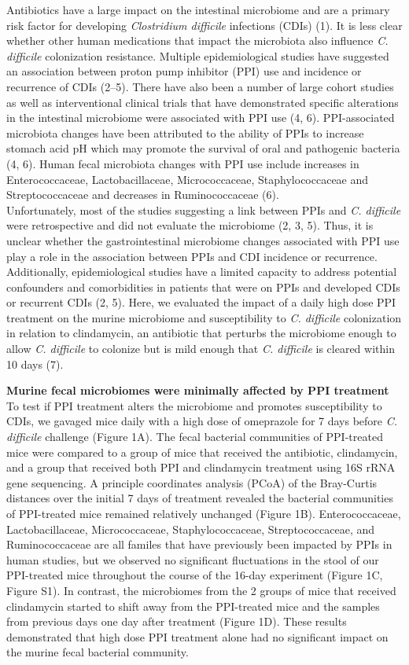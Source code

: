 \documentclass[11pt,]{article}
\begin{document}
Antibiotics have a large impact on the intestinal microbiome and are a
primary risk factor for developing \emph{Clostridium difficile}
infections (CDIs) (1). It is less clear whether other human medications
that impact the microbiota also influence \emph{C. difficile}
colonization resistance. Multiple epidemiological studies have suggested
an association between proton pump inhibitor (PPI) use and incidence or
recurrence of CDIs (2--5). There have also been a number of large cohort
studies as well as interventional clinical trials that have demonstrated
specific alterations in the intestinal microbiome were associated with
PPI use (4, 6). PPI-associated microbiota changes have been attributed
to the ability of PPIs to increase stomach acid pH which may promote the
survival of oral and pathogenic bacteria (4, 6). Human fecal microbiota
changes with PPI use include increases in Enterococcaceae,
Lactobacillaceae, Micrococcaceae, Staphylococcaceae and Streptococcaceae
and decreases in Ruminococcaceae (6).\\
Unfortunately, most of the studies suggesting a link between PPIs and
\emph{C. difficile} were retrospective and did not evaluate the
microbiome (2, 3, 5). Thus, it is unclear whether the gastrointestinal
microbiome changes associated with PPI use play a role in the
association between PPIs and CDI incidence or recurrence. Additionally,
epidemiological studies have a limited capacity to address potential
confounders and comorbidities in patients that were on PPIs and
developed CDIs or recurrent CDIs (2, 5). Here, we evaluated the impact
of a daily high dose PPI treatment on the murine microbiome and
susceptibility to \emph{C. difficile} colonization in relation to
clindamycin, an antibiotic that perturbs the microbiome enough to allow
\emph{C. difficile} to colonize but is mild enough that \emph{C.
difficile} is cleared within 10 days (7).

\textbf{Murine fecal microbiomes were minimally affected by PPI
treatment } To test if PPI treatment alters the microbiome and promotes
susceptibility to CDIs, we gavaged mice daily with a high dose of
omeprazole for 7 days before \emph{C. difficile} challenge (Figure 1A).
The fecal bacterial communities of PPI-treated mice were compared to a
group of mice that received the antibiotic, clindamycin, and a group
that received both PPI and clindamycin treatment using 16S rRNA gene
sequencing. A principle coordinates analysis (PCoA) of the Bray-Curtis
distances over the initial 7 days of treatment revealed the bacterial
communities of PPI-treated mice remained relatively unchanged (Figure
1B). Enterococcaceae, Lactobacillaceae, Micrococcaceae,
Staphylococcaceae, Streptococcaceae, and Ruminococcaceae are all familes
that have previously been impacted by PPIs in human studies, but we
observed no significant fluctuations in the stool of our PPI-treated
mice throughout the course of the 16-day experiment (Figure 1C, Figure
S1). In contrast, the microbiomes from the 2 groups of mice that
received clindamycin started to shift away from the PPI-treated mice and
the samples from previous days one day after treatment (Figure 1D).
These results demonstrated that high dose PPI treatment alone had no
significant impact on the murine fecal bacterial community.
\end{document}
